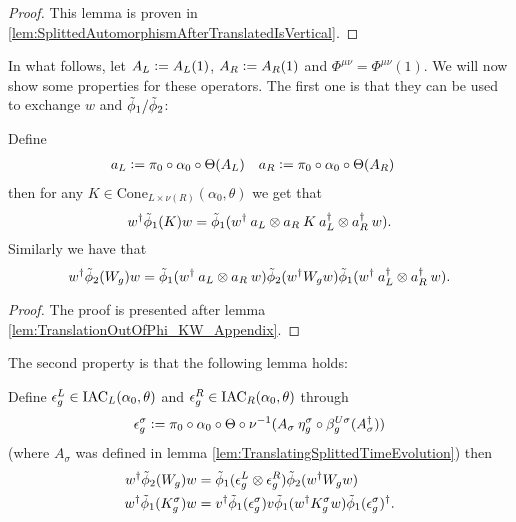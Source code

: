 \documentclass[11pt,a4paper,twoside]{article}
\numberwithin{equation}{section}
\begin{document}
\begin{proof}
	This lemma is proven in \ref{lem:SplittedAutomorphismAfterTranslatedIsVertical}.
\end{proof}
In what follows, let $A_L\vcentcolon= A_L(1)$, $A_R\vcentcolon= A_R(1)$ and $\Phi^{\mu\nu}=\Phi^{\mu\nu}(1)$. We will now show some properties for these operators. The first one is that they can be used to exchange $w$ and $\tilde{\phi}_1/\tilde{\phi}_2$:
\begin{lemma}\label{lem:TranslationOutOfPhi_KW}
	Define
	\begin{align}
		a_L&\vcentcolon= \pi_0\circ\alpha_0\circ\Theta(A_L)&a_R&\vcentcolon= \pi_0\circ\alpha_0\circ\Theta(A_R)
	\end{align}
	then for any $K\in\text{Cone}_{L\times\nu(R)}(\alpha_0,\theta)$ we get that
	\begin{equation}\label{eq:TranslationOutOfPhi_K}
		w^\dagger \tilde{\phi}_1(K)w=\tilde{\phi}_1(w^\dagger \: a_L\otimes a_R \: K \: a_L^\dagger\otimes a_R^\dagger \: w).
	\end{equation}
	Similarly we have that
	\begin{equation}\label{eq:TranslationOutOfPhi_W}
		w^\dagger \tilde{\phi}_2(W_g)w=\tilde{\phi}_1(w^\dagger \: a_L\otimes a_R \: w)\tilde{\phi}_2(w^\dagger W_g w)\tilde{\phi}_1(w^\dagger \: a_L^\dagger\otimes a_R^\dagger \: w).
	\end{equation}
\end{lemma}
\begin{proof}
	The proof is presented after lemma \ref{lem:TranslationOutOfPhi_KW_Appendix}.
\end{proof}
The second property is that the following lemma holds:
\begin{lemma}\label{lem:DefinitionOfEpsilons}
	Define $\epsilon^L_g\in\textrm{IAC}_L(\alpha_0,\theta)$ and $\epsilon^R_g\in\textrm{IAC}_R(\alpha_0,\theta)$ through
	\begin{align}
		\epsilon_g^\sigma\vcentcolon= \pi_0\circ\alpha_0\circ\Theta\circ\nu^{-1}(A_\sigma\:\eta_g^\sigma\circ\beta_{g}^{U\sigma}(A_\sigma^\dagger))
	\end{align}
	(where $A_\sigma$ was defined in lemma \ref{lem:TranslatingSplittedTimeEvolution}) then
	\begin{align}
		w^\dagger \tilde{\phi}_2(W_g)w &= \tilde{\phi}_1(\epsilon_g^L\otimes\epsilon_g^R)\tilde{\phi}_2(w^\dagger W_g w)\\
		\label{eq:TransformationOfKUnderEpsilon}
		w^\dagger \tilde{\phi}_1(K_g^\sigma)w&=v^\dagger\tilde{\phi}_1(\epsilon_g^\sigma)v\tilde{\phi}_1(w^\dagger K_g^\sigma w)\tilde{\phi}_1(\epsilon_g^\sigma)^\dagger.
	\end{align}
\end{lemma}
\end{document}
